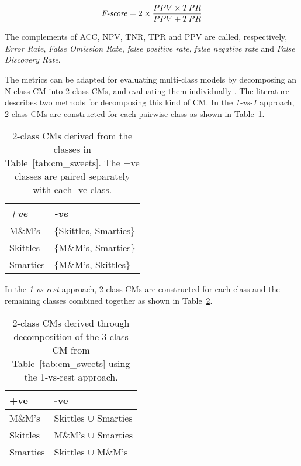 \begin{equation}
\label{eq:cm_fscore}
\textnormal{\textit{F-score}} = 2 \times \frac{PPV \times TPR}{PPV + TPR}
\end{equation}

The complements of ACC, NPV, TNR, TPR and PPV are called, respectively, \textit{Error Rate}, \textit{False Omission Rate}, \textit{false positive rate}, \textit{false negative rate} and \textit{False Discovery Rate}.

The metrics can be adapted for evaluating multi-class models by decomposing an N-class CM into 2-class CMs, and evaluating them individually \citep{stager2006dealing}. The literature describes two methods for decomposing this kind of  CM. In the \textit{1-vs-1} approach, 2-class CMs are constructed for each pairwise class as shown in Table~\ref{tab:cm_1vs1}.

\begin{table}[ht]
  \centering
  \selectfont
  \begin{tabular}{ll}
    \toprule
    \textit{+ve} & \textit{-ve} \\
    \midrule
    M\&M's       & $\{$Skittles, Smarties$\}$ \\
    Skittles     & $\{$M\&M's, Smarties$\}$ \\
    Smarties     & $\{$M\&M's, Skittles$\}$ \\
    \bottomrule
  \end{tabular}
  \caption{2-class CMs derived from the classes in Table~\ref{tab:cm_sweets}. The +ve classes are paired separately with each -ve class.}
  \label{tab:cm_1vs1}
\end{table}
\vspace{2mm}

In the \textit{1-vs-rest} approach, 2-class CMs are constructed for each class and the remaining classes combined together as shown in Table~\ref{tab:cm_1vsN}.

\begin{table}[ht]
  \centering
  \selectfont
  \begin{tabular}{ll}
    \toprule
    +ve       & -ve \\
    \midrule
    M\&M's    & Skittles $\cup$ Smarties \\
    Skittles  & M\&M's $\cup$ Smarties \\
    Smarties  & Skittles $\cup$ M\&M's \\
    \bottomrule
  \end{tabular}
  \caption{2-class CMs derived through decomposition of the 3-class CM from Table~\ref{tab:cm_sweets} using the 1-vs-rest approach.}
  \label{tab:cm_1vsN}
\end{table}
\vspace{2mm}

